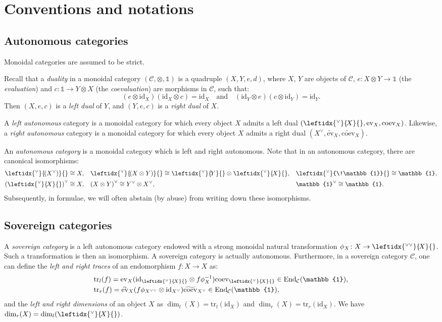 \documentclass[a4paper]{amsart}
\theoremstyle{definition}
\newcommand{\co}{\colon}
\newcommand{\id}{\mathrm{id}}
\newcommand{\cc}{\mathcal{C}}
\newcommand{\un}{\mathbb{1}}
\newcommand{\End}{\mathrm{End}}
\newcommand{\tr}{\mathrm{tr}}
\newcommand{\lev}{\mathrm{ev}}
\newcommand{\rev}{\widetilde{\mathrm{ev}}}
\newcommand{\lcoev}{\mathrm{coev}}
\newcommand{\rcoev}{\widetilde{\mathrm{coev}}}
\newcommand{\ldual}[1]{\leftidx{^\vee}{\!#1}{}}
\newcommand{\rdual}[1]{{#1}^\vee}
\newcommand{\lldual}[1]{\leftidx{^{\vee\vee}}{\!#1}{}}
\newcommand{\rrdual}[1]{{#1}^{\vee\vee}}
\begin{document}
\section{Conventions and notations}

\subsection{Autonomous categories}
Monoidal categories are assumed to be strict.

Recall that a \emph{duality} in a monoidal category $(\cc,\otimes,\un)$ is a quadruple $(X,Y,e,d)$, where $X$, $Y$ are
objects of $\cc$, $e\co X \otimes Y \to \un$ (the \emph{evaluation}) and $c \co \un \to Y \otimes X$ (the
\emph{coevaluation}) are morphisms in $\cc$, such that:
\begin{equation*}
(e \otimes \id_X)(\id_X \otimes c)=\id_X \quad \text{and} \quad (\id_Y \otimes e)(c \otimes \id_Y)=\id_Y.
\end{equation*}
Then $(X,e,c)$ is a \emph{left dual} of $Y$, and $(Y,e,c)$ is a \emph{right dual} of $X$.

A \emph{left autonomous} category is a monoidal category for which every object $X$ admits a left dual
$(\ldual{X},\lev_X,\lcoev_X)$. Likewise, a \emph{right autonomous} category is a monoidal category for which every object
$X$ admits a right dual $(\rdual{X},\rev_X,\rcoev_X)$.

An \emph{autonomous category} is a monoidal category which is left and right autonomous. Note that in an autonomous
category, there are canonical isomorphisms:
\begin{align*}
&\ldual{(\rdual{X})}\cong X, && \ldual{(X \otimes Y)} \cong \ldual{Y} \otimes \ldual{X}, && \ldual{\un} \cong \un, \\
&\rdual{(\ldual{X})}\cong X, && \rdual{(X \otimes Y)} \cong \rdual{Y} \otimes \rdual{X}, &&  \rdual{\un}\cong \un.
\end{align*}
Subsequently, in formulae, we will often abstain (by abuse) from writing down these isomorphisms.

\subsection{Sovereign categories}
A \emph{sovereign category} is a left autonomous category endowed with a strong monoidal natural transformation $\phi_X\co X
\to \lldual{X}$. Such a transformation is then an isomorphism. A sovereign category is actually autonomous. Furthermore, in a sovereign category $\cc$, one can define the \emph{left and right traces} of an
endomorphism $f\co X \to X$ as:
\begin{align*}
&\tr_l(f)=\lev_X(\id_{\ldual{X}} \otimes f\phi_X^{-1}) \lcoev_{\ldual{X}} \in \End_\cc(\un), \\
&\tr_r(f)=\rev_X( f\phi_{\rrdual{X}} \otimes \id_{\rdual{X}}) \rcoev_{\rdual{X}} \in \End_\cc(\un),
\end{align*}
and the \emph{left and right dimensions} of an object $X$ as $\dim_l(X)=\tr_l(\id_X) $ and $\dim_r(X)=\tr_r(\id_X)$. We have $\dim_r(X)=\dim_l(\ldual{X})$.
\end{document}
